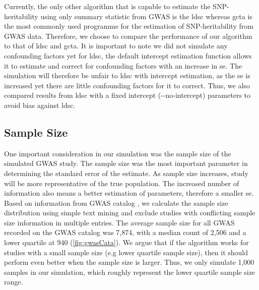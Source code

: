 		Currently, the only other algorithm that is capable to estimate the \gls{SNP}-heritability using only summary statistic from \gls{GWAS} is the \gls{ldsc} \citep{Bulik-Sullivan2015} whereas \gls{gcta} \citep{Yang2011} is the most commonly used programme for the estimation of \gls{SNP}-heritability from \gls{GWAS} data. 
		Therefore, we choose to compare the performance of our algorithm to that of \gls{ldsc} and \gls{gcta}.
		It is important to note we did not simulate any confounding factors yet for \gls{ldsc}, the default intercept estimation function allows it to estimate and correct for confounding factors with an increase in \gls{se}. 
		The simulation will therefore be unfair to \gls{ldsc} with intercept estimation, as the \gls{se} is increased yet there are little confounding factors for it to correct.
		Thus, we also compared results from \gls{ldsc} with a fixed intercept (-{}-no-intercept) parameters to avoid bias against \gls{ldsc}.	
		
		\subsection{Sample Size}
			One important consideration in our simulation was the sample size of the simulated \gls{GWAS} study. 
			The sample size was the most important parameter in determining the standard error of the estimate. 
			As sample size increases, study will be more representative of the true population. 
			The increased number of information also means a better estimation of parameters, therefore a smaller \acrfull{se}.
			Based on information from \gls{GWAS} catalog \citep{Welter2014}, we calculate the sample size distribution using simple text mining and exclude studies with conflicting sample size information in multiple entries. 
			The average sample size for all \gls{GWAS} recorded on the \gls{GWAS} catalog was 7,874, with a median count of 2,506 and a lower quartile at 940 (\cref{fig:gwasCata}). 
			We argue that if the algorithm works for studies with a small sample size (e.g lower quartile sample size), then it should perform even better when the sample size is larger. 
			Thus, we only simulate 1,000 samples in our simulation, which roughly represent the lower quartile sample size range.
				
